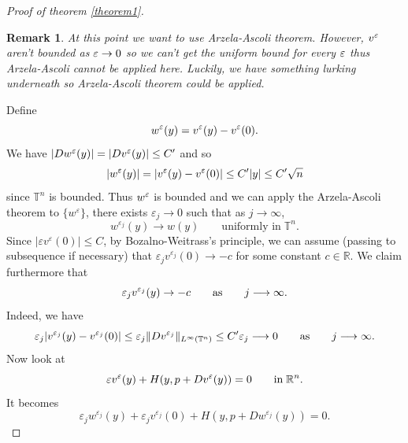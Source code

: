 \documentclass[12pt, oneside]{amsart}  	%
\newtheorem{remark}{Remark}
\begin{document}
\begin{proof}[Proof of theorem \ref{theorem1}]
\begin{remark}
At this point we want to use Arzela-Ascoli theorem. However, $v^\varepsilon$ aren't bounded as $\varepsilon\to0$ so we can't get the uniform bound for every $\varepsilon$ thus Arzela-Ascoli cannot be applied here. Luckily, we have something lurking underneath so Arzela-Ascoli theorem could be applied. 
\end{remark}

Define
		$$w^\varepsilon(y)=v^\varepsilon(y)-v^\varepsilon(0).$$
We have $|Dw^\varepsilon(y)| = |Dv^\varepsilon(y)| \le C'$ and so 
\begin{equation*}
|w^\varepsilon(y)|= |v^\varepsilon(y)-v^\varepsilon(0)|\le C'|y| \leq C'\sqrt{n}
\end{equation*}
since $\mathbb{T}^n$ is bounded. Thus $w^\varepsilon$ is bounded and we can apply the Arzela-Ascoli theorem to $\{w^\varepsilon\}$, there exists $\varepsilon_j\longrightarrow 0$ such that as $j\longrightarrow\infty$,
\begin{equation}\label{w_uniformly}
w^{\varepsilon_j}(y) \longrightarrow w(y) \qquad\text{uniformly in}\;\mathbb{T}^n.
\end{equation}
Since $|\varepsilon v^\varepsilon(0)| \leq C$, by Bozalno-Weitrass's principle, we can assume (passing to subsequence if necessary) that $\varepsilon_j v^{\varepsilon_j}(0)\longrightarrow -c$ for some constant $c\in \mathbb{R}$. We claim furthermore that
\begin{equation*}
\varepsilon_j v^{\varepsilon_j}(y)\to -c\qquad\text{as}\qquad j\longrightarrow\infty.
\end{equation*}
Indeed, we have
\begin{equation*}
\varepsilon_j|v^{\varepsilon_j}(y)-v^{\varepsilon_j}(0)| \leq \varepsilon_j \Vert Dv^{\varepsilon_j}\Vert_{L^\infty(\mathbb{T}^n)} \leq C'\varepsilon_j \longrightarrow 0 \qquad\text{as}\qquad j\longrightarrow \infty.
\end{equation*}
Now look at
\begin{equation*}
\varepsilon v^\varepsilon(y) + H(y, p+Dv^\varepsilon(y))=0\qquad \text{in}\; \mathbb{R}^n.
\end{equation*}
It becomes
\begin{equation}\label{my_eqn}
\varepsilon_{j}
w^{\varepsilon_{j}}\left(y\right) + 
\varepsilon_{j} v^{\varepsilon_{j}}(0) +
H(y,p+ Dw^{\varepsilon_{j}}(y)) = 0.
\end{equation}
\vspace*{0.1cm}


\end{proof}
\end{document}
